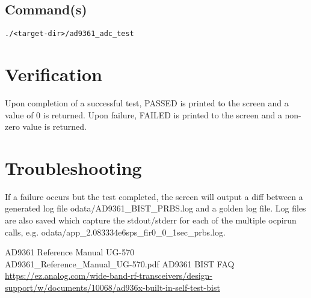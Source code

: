 \subsection{Command(s)}
\begin{lstlisting}
./<target-dir>/ad9361_adc_test
\end{lstlisting}
\section{Verification}
Upon completion of a successful test, PASSED is printed to the screen and a value of 0 is returned. Upon failure, FAILED is printed to the screen and a non-zero value is returned.

\section{Troubleshooting}
If a failure occurs but the test completed, the screen will output a diff between a generated log file odata/AD9361\_BIST\_PRBS.log and a golden log file. Log files are also saved which capture the stdout/stderr for each of the multiple ocpirun calls, e.g. odata/app\_2.083334e6sps\_fir0\_0\_1sec\_prbs.log.

\begin{thebibliography}{1}

 AD9361 Reference Manual UG-570\\
AD9361\_Reference\_Manual\_UG-570.pdf
 AD9361 BIST FAQ \\
\url{https://ez.analog.com/wide-band-rf-transceivers/design-support/w/documents/10068/ad936x-built-in-self-test-bist}

\end{thebibliography}


